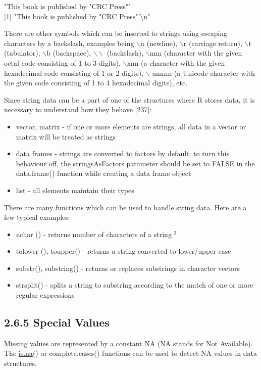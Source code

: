 \documentclass[10pt]{book}
\begin{document}
\begin{displayquote}
"This book is published by "CRC Press""\\[0pt]
[1] "This book is published by "CRC Press"'\textbackslash n"
\end{displayquote}

There are other symbols which can be inserted to strings using escaping characters by a backslash, examples being $\backslash \mathrm{n}$ (newline), $\backslash \mathrm{r}$ (carriage return), $\backslash \mathrm{t}$ (tabulator), $\backslash \mathrm{b}$ (backspace), $\backslash \backslash$ (backslash), $\backslash \mathrm{nnn}$ (character with the given octal code consisting of 1 to 3 digits), $\backslash \mathrm{xnn}$ (a character with the given hexadecimal code consisting of 1 or 2 digits), $\backslash$ unnnn (a Unicode character with the given code consisting of 1 to 4 hexadecimal digits), etc.

Since string data can be a part of one of the structures where R stores data, it is necessary to understand how they behave [237]:

\begin{itemize}
  \item vector, matrix - if one or more elements are strings, all data in a vector or matrix will be treated as strings
  \item data frames - strings are converted to factors by default; to turn this behaviour off, the stringsAsFactors parameter should be set to FALSE in the data.frame() function while creating a data frame object
  \item list - all elements maintain their types
\end{itemize}

There are many functions which can be used to handle string data. Here are a few typical examples:

\begin{itemize}
  \item nchar () - returns number of characters of a string ${ }^{3}$
  \item tolower (), toupper() - returns a string converted to lower/upper case
  \item substr(), substring() - returns or replaces substrings in character vectors
  \item strsplit() - splits a string to substring according to the match of one or more regular expressions
\end{itemize}

\subsection*{2.6.5 Special Values}
Missing values are represented by a constant NA (NA stands for Not Available). The \href{http://is.na}{is.na}() or complete.cases() functions can be used to detect NA values in data structures.
\end{document}
